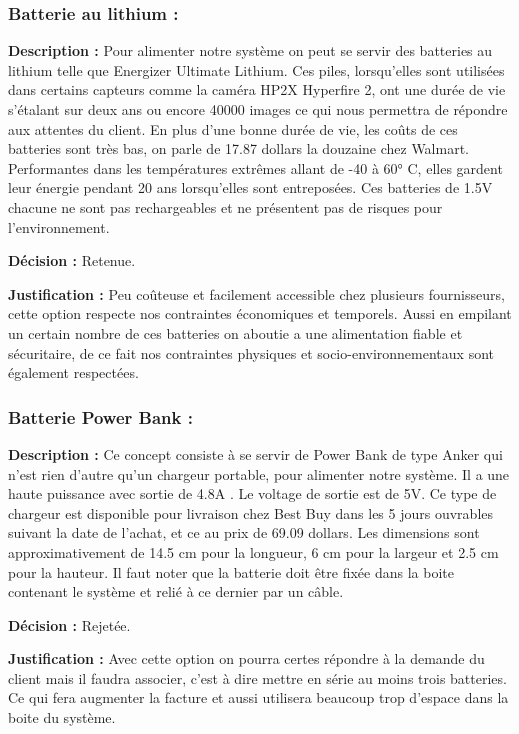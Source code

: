 \subsubsection{Batterie au lithium :}

\textbf{Description :}
Pour alimenter notre système on peut se servir des batteries au lithium telle que Energizer Ultimate Lithium. Ces piles, lorsqu'elles sont utilisées dans certains capteurs comme la caméra HP2X Hyperfire 2, ont une durée de vie s'étalant sur deux ans ou encore 40000 images ce qui nous permettra de répondre aux attentes du client. En plus d'une bonne durée de vie, les coûts de ces batteries sont très bas, on parle de 17.87 dollars la douzaine chez Walmart. Performantes dans les températures extrêmes allant de -40 à 60° C, elles gardent leur énergie pendant 20 ans lorsqu'elles sont entreposées. Ces batteries de 1.5V chacune ne sont pas rechargeables et ne présentent pas de risques pour l'environnement.
 
 \textbf{Décision :}
 Retenue.
 
 \textbf{Justification :}
 Peu coûteuse et facilement accessible chez plusieurs fournisseurs, cette option respecte nos contraintes économiques et temporels. Aussi en empilant un certain nombre de ces batteries on aboutie a une alimentation fiable et sécuritaire, de ce fait nos contraintes physiques et socio-environnementaux sont également respectées.
 
\subsubsection{Batterie Power Bank :}
\textbf{Description :}
 Ce concept consiste à se servir de Power Bank de type Anker qui n'est rien d'autre qu'un chargeur portable, pour alimenter notre système. Il a une haute puissance avec sortie de 4.8A . Le voltage de sortie est de 5V. Ce type de chargeur est disponible pour livraison chez Best Buy dans les 5 jours ouvrables suivant la date de l'achat, et ce au prix de 69.09 dollars. Les dimensions sont approximativement de 14.5 cm pour la longueur, 6 cm pour la largeur et 2.5 cm pour la hauteur. Il faut noter que la batterie doit être fixée dans la boite contenant le système et relié à ce dernier par un câble.
 
\textbf{Décision :}
 Rejetée.
 
\textbf{Justification :}
Avec cette option on pourra certes répondre à la demande du client mais il faudra associer, c'est à dire  mettre en série au moins trois batteries. Ce qui fera augmenter la facture et aussi utilisera beaucoup trop d'espace  dans la boite du système.
 
